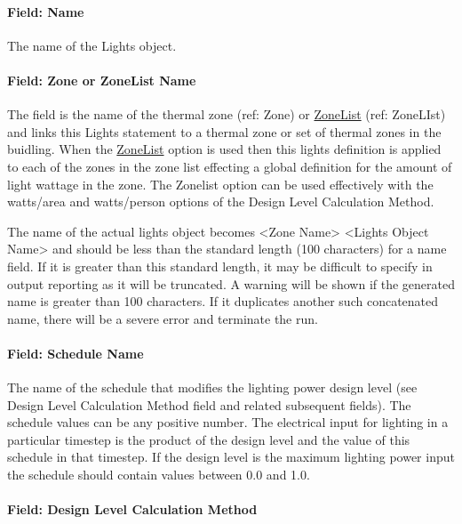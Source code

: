 \paragraph{Field: Name}\label{field-name-2-020}

The name of the Lights object.

\paragraph{Field: Zone or ZoneList Name}\label{field-zone-or-zonelist-name-1-000}

The field is the name of the thermal zone (ref: Zone) or \hyperref[zonelist]{ZoneList} (ref: ZoneLIst) and links this Lights statement to a thermal zone or set of thermal zones in the buidling. When the \hyperref[zonelist]{ZoneList} option is used then this lights definition is applied to each of the zones in the zone list effecting a global definition for the amount of light wattage in the zone. The Zonelist option can be used effectively with the watts/area and watts/person options of the Design Level Calculation Method.

The name of the actual lights object becomes \textless{}Zone Name\textgreater{} \textless{}Lights Object Name\textgreater{} and should be less than the standard length (100 characters) for a name field. If it is greater than this standard length, it may be difficult to specify in output reporting as it will be truncated. A warning will be shown if the generated name is greater than 100 characters. If it duplicates another such concatenated name, there will be a severe error and terminate the run.

\paragraph{Field: Schedule Name}\label{field-schedule-name-002}

The name of the schedule that modifies the lighting power design level (see Design Level Calculation Method field and related subsequent fields). The schedule values can be any positive number. The electrical input for lighting in a particular timestep is the product of the design level and the value of this schedule in that timestep. If the design level is the maximum lighting power input the schedule should contain values between 0.0 and 1.0.

\paragraph{Field: Design Level Calculation Method}\label{field-design-level-calculation-method}

